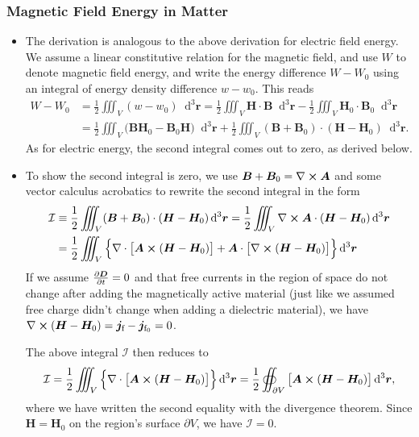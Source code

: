 \documentclass[11pt, a4paper]{article}
\newcommand{\diff}{\mathop{}\!\mathrm{d}} %
\newcommand{\dr}{\diff^{3} \r}  %
\renewcommand{\vec}[1]{\bm{#1}} %
\renewcommand{\r}{\vec{r}}
\newcommand{\D}{\vec{D}}  %
\newcommand{\B}{\vec{B}} %
\renewcommand{\H}{\vec{H}}  %
\newcommand{\A}{\vec{A}} %
\renewcommand{\j}{\vec{j}}  %
\renewcommand{\div}{\nabla \cdot}
\renewcommand{\curl}{\nabla \cross}
\begin{document}
\subsubsection{Magnetic Field Energy in Matter}
\begin{itemize}
	\item The derivation is analogous to the above derivation for electric field energy. We assume a linear constitutive relation for the magnetic field, and use $ W $ to denote magnetic field energy, and write the energy difference $ W - W_{0} $ using an integral of energy density difference $ w - w_{0} $. This reads
	\begin{align*}
        W - W_{0} &= \frac{1}{2}\iiint_{V}(w - w_{0}) \dr = \frac{1}{2} \iiint_{V} \H \cdot \B  \dr - \frac{1}{2}\iiint_{V}\H_{0}\cdot\B_{0}\dr\\
		& = \frac{1}{2}\iiint_{V}\big(\B \H_{0} - \B_{0}\H\big)\dr + \frac{1}{2}\iiint_{V}(\B + \B_{0})\cdot(\H - \H_{0}) \dr.
	\end{align*}
    As for electric energy, the second integral comes out to zero, as derived below.

    \item To show the second integral is zero, we use $ \B + \B_{0} = \curl \A $ and some vector calculus acrobatics to rewrite the second integral in the form
    \begin{align*}
        \mathcal{I} & \equiv \frac{1}{2}\iiint_{V}(\B + \B_{0})\cdot(\H - \H_{0}) \dr = \frac{1}{2}\iiint_{V}\curl \A \cdot (\H - \H_{0}) \dr\\
        & = \frac{1}{2} \iiint_{V} \Big\{ \div \big[ \A \cross (\H - \H_{0}) \big] + \A \cdot \big[ \curl (\H - \H_{0}) \big] \Big \} \dr
    \end{align*}
    If we assume $ \pdv{\D}{t} = 0 $ and that free currents in the region of space do not change after adding the magnetically active material (just like we assumed free charge didn't change when adding a dielectric material), we have $ \curl (\H - \H_{0}) = \j_{\text{f}} - \j_{\text{f}_{0}} = 0 $. 

    The above integral $ \mathcal{I} $ then reduces to
    \begin{equation*}
        \mathcal{I} = \frac{1}{2} \iiint_{V} \Big\{ \div \big[ \A \cross (\H - \H_{0}) \big] \Big \} \dr = \frac{1}{2} \oiint_{\partial V} \big[ \A \cross (\H - \H_{0}) \big] \dr,
    \end{equation*}
    where we have written the second equality with the divergence theorem. Since $ \H = \H_{0} $ on the region's surface $ \partial V $, we have $ \mathcal{I} = 0 $.


\end{itemize}
\end{document}

